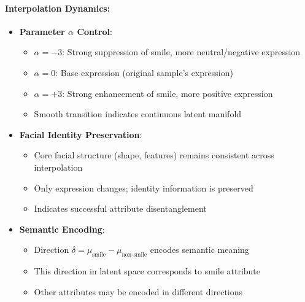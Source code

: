 \documentclass[conference]{IEEEtran}
\begin{document}
\paragraph{Interpolation Dynamics:}
\begin{itemize}
    \item \textbf{Parameter $\alpha$ Control}:
    \begin{itemize}
        \item $\alpha = -3$: Strong suppression of smile, more neutral/negative expression
        \item $\alpha = 0$: Base expression (original sample's expression)
        \item $\alpha = +3$: Strong enhancement of smile, more positive expression
        \item Smooth transition indicates continuous latent manifold
    \end{itemize}
    
    \item \textbf{Facial Identity Preservation}:
    \begin{itemize}
        \item Core facial structure (shape, features) remains consistent across interpolation
        \item Only expression changes; identity information is preserved
        \item Indicates successful attribute disentanglement
    \end{itemize}
    
    \item \textbf{Semantic Encoding}:
    \begin{itemize}
        \item Direction $\delta = \mu_{\text{smile}} - \mu_{\text{non-smile}}$ encodes semantic meaning
        \item This direction in latent space corresponds to smile attribute
        \item Other attributes may be encoded in different directions
    \end{itemize}
\end{itemize}
\end{document}
